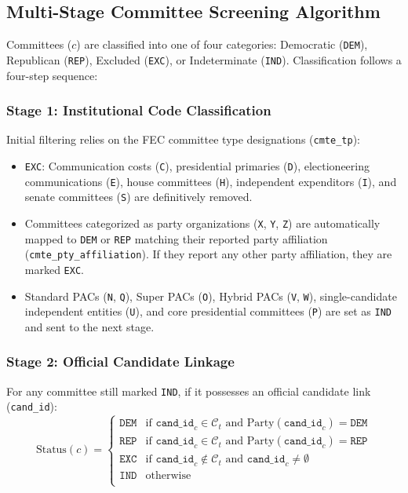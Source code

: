 \subsection{Multi-Stage Committee Screening Algorithm}
Committees ($c$) are classified into one of four categories: Democratic (\texttt{DEM}), Republican (\texttt{REP}), Excluded (\texttt{EXC}), or Indeterminate (\texttt{IND}). Classification follows a four-step sequence:

\subsubsection{Stage 1: Institutional Code Classification}
Initial filtering relies on the FEC committee type designations (\texttt{cmte\_tp}):
\begin{itemize}
    \item \texttt{EXC}: Communication costs (\texttt{C}), presidential primaries (\texttt{D}), electioneering communications (\texttt{E}), house committees (\texttt{H}), independent expenditors (\texttt{I}), and senate committees (\texttt{S}) are definitively removed.
    \item Committees categorized as party organizations (\texttt{X}, \texttt{Y}, \texttt{Z}) are automatically mapped to \texttt{DEM} or \texttt{REP} matching their reported party affiliation (\texttt{cmte\_pty\_affiliation}). If they report any other party affiliation, they are marked \texttt{EXC}.
    \item Standard PACs (\texttt{N}, \texttt{Q}), Super PACs (\texttt{O}), Hybrid PACs (\texttt{V}, \texttt{W}), single-candidate independent entities (\texttt{U}), and core presidential committees (\texttt{P}) are set as \texttt{IND} and sent to the next stage.
\end{itemize}

\subsubsection{Stage 2: Official Candidate Linkage}
For any committee still marked \texttt{IND}, if it possesses an official candidate link (\texttt{cand\_id}):
\begin{equation}
    \text{Status}(c) = \begin{cases} 
        \texttt{DEM} & \text{if } \texttt{cand\_id}_c \in \mathcal{C}_t \text{ and Party}(\texttt{cand\_id}_c) = \texttt{DEM} \\
        \texttt{REP} & \text{if } \texttt{cand\_id}_c \in \mathcal{C}_t \text{ and Party}(\texttt{cand\_id}_c) = \texttt{REP} \\
        \texttt{EXC} & \text{if } \texttt{cand\_id}_c \notin \mathcal{C}_t \text{ and } \texttt{cand\_id}_c \neq \emptyset \\
        \texttt{IND} & \text{otherwise} \\
    \end{cases}
\end{equation}

